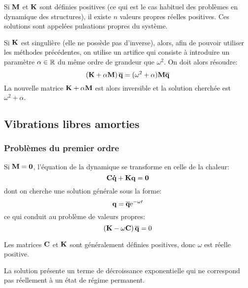 \medskip
{}
Si $\MM{M}$ et $\MM{K}$ sont définies positives (ce qui est le cas habituel des problèmes en dynamique 
des structures), il existe $n$ valeurs propres réelles positives. Ces solutions sont appelées
pulsations propres du système.

Si $\MM{K}$ est singulière (elle ne possède pas d'inverse), alors, afin de pouvoir utiliser les méthodes
précédentes, on utilise un artifice qui consiste à introduire un paramètre $\alpha\in\mathbb R$ du 
même ordre de grandeur que $\omega^2$. On doit alors résoudre:
\begin{equation}\left(\MM{K}+\alpha \MM{M}\right)\VV{\overline{q}} = (\omega^2+\alpha)\MM{M} \VV{\overline{q}}\end{equation}
La nouvelle matrice $\MM{K}+\alpha \MM{M}$ est alors inversible et la solution cherchée est $\omega^2+\alpha$.

\medskip
\subsection{Vibrations libres amorties}
\subsubsection{Problèmes du premier ordre}
Si $\MM{M}=\MM{0}$, l'équation de la dynamique se 
transforme en celle de la chaleur:
\begin{equation} \MM{C}\VV{\dot{q}}+\MM{K}\VV{q}=\VV{0} \end{equation}
dont on cherche une solution générale sous la forme:
\begin{equation} \VV{q}=\VV{\overline{q}}\mathrm{e}^{-\omega t} \end{equation}
ce qui conduit au problème de valeurs propres:
\begin{equation} \left(\MM{K}-\omega\MM{C}\right)\VV{\overline{q}}=0\end{equation}

Les matrices $\MM{C}$ et $\MM{K}$ sont généralement définies positives, donc $\omega$ est réelle positive.

La solution présente un terme de décroissance exponentielle qui ne correspond pas réellement à un
état de régime permanent.


\medskip
